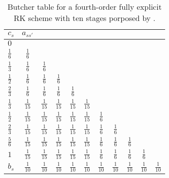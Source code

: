 \begin{table}[t]
\caption{Butcher table for a fourth-order fully explicit RK scheme with ten stages porposed by \cite{Ketcheson2008RK4o10s}.}
\begin{subtable}{\linewidth}
\begin{tabular}{lcccccccccc}
$c_s$ & $a_{ss'}$ & & & & & & & & & \\
\hline
$0$ & &&&&&&&&&  \\
$\frac{1}{6}$ & $\frac{1}{6}$ &  &&&&&&&& \\
$\frac{1}{3}$ & $\frac{1}{6}$ & $\frac{1}{6}$ &&&&&&&& \\
$\frac{1}{2}$ & $\frac{1}{6}$ & $\frac{1}{6}$ & $\frac{1}{6}$ &&&&&&& \\
$\frac{2}{3}$ & $\frac{1}{6}$ & $\frac{1}{6}$ & $\frac{1}{6}$ & $\frac{1}{6}$ &&&&&& \\
$\frac{1}{3}$ & $\frac{1}{15}$ & $\frac{1}{15}$ & $\frac{1}{15}$ & $\frac{1}{15}$ & $\frac{1}{15}$ &&&&& \\
$\frac{1}{2}$ & $\frac{1}{15}$ & $\frac{1}{15}$ & $\frac{1}{15}$ & $\frac{1}{15}$ & $\frac{1}{15}$ & $\frac{1}{6}$ &&&& \\
$\frac{2}{3}$ & $\frac{1}{15}$ & $\frac{1}{15}$ & $\frac{1}{15}$ & $\frac{1}{15}$ & $\frac{1}{15}$ & $\frac{1}{6}$ & $\frac{1}{6}$ &&& \\
$\frac{5}{6}$ & $\frac{1}{15}$ & $\frac{1}{15}$ & $\frac{1}{15}$ & $\frac{1}{15}$ & $\frac{1}{15}$ & $\frac{1}{6}$ & $\frac{1}{6}$ & $\frac{1}{6}$ && \\
$1$ & $\frac{1}{15}$ & $\frac{1}{15}$ & $\frac{1}{15}$ & $\frac{1}{15}$ & $\frac{1}{15}$ & $\frac{1}{6}$ & $\frac{1}{6}$ & $\frac{1}{6}$ & $\frac{1}{6}$ & \\
\hline
$b_s$ & $\frac{1}{10}$ & $\frac{1}{10}$ & $\frac{1}{10}$ & $\frac{1}{10}$ & $\frac{1}{10}$ & $\frac{1}{10}$ & $\frac{1}{10}$ & $\frac{1}{10}$ & $\frac{1}{10}$ & $\frac{1}{10}$ \\ 
\end{tabular}
\label{tb:Butcher_tbl_EXRK_o4s10}
\end{subtable}
\vspace{.5cm}


\end{table}
